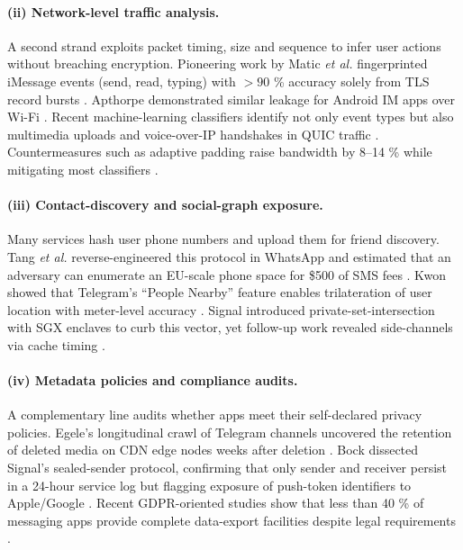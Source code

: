 \documentclass[a4paper,12pt]{report}
\begin{document}
\paragraph{(ii) Network-level traffic analysis.}
A second strand exploits packet timing, size and sequence to infer user
actions without breaching encryption.
Pioneering work by Matic \emph{et al.} fingerprinted iMessage events
(send, read, typing) with $>90$ \% accuracy solely from TLS record
bursts \cite{matic2015iMessage}.
Apthorpe demonstrated similar leakage for Android IM apps over Wi-Fi
\cite{apthorpe2018smart}.
Recent machine-learning classifiers identify not only event types but also
multimedia uploads and voice-over-IP handshakes in QUIC traffic
\cite{lee2023quic}.
Countermeasures such as adaptive padding raise bandwidth by 8–14 \%
while mitigating most classifiers \cite{poblete2021defence}.

\paragraph{(iii) Contact-discovery and social-graph exposure.}
Many services hash user phone numbers and upload them for friend
discovery.  Tang \emph{et al.} reverse-engineered this protocol in
WhatsApp and estimated that an adversary can enumerate an EU-scale phone
space for \$500 of SMS fees \cite{tang2020whatsappHash}.
Kwon showed that Telegram’s “People Nearby” feature enables trilateration
of user location with meter-level accuracy \cite{kwon2021telegram}.  Signal
introduced private-set‐intersection with SGX enclaves to curb this vector,
yet follow-up work revealed side-channels via cache timing
\cite{marforio2022psi}.

\paragraph{(iv) Metadata policies and compliance audits.}
A complementary line audits whether apps meet their self-declared privacy
policies.  Egele’s longitudinal crawl of Telegram channels uncovered the
retention of deleted media on CDN edge nodes weeks after deletion
\cite{egele2019cdn}.
Bock dissected Signal’s sealed-sender protocol, confirming that only
sender and receiver persist in a 24-hour service log but flagging
exposure of push-token identifiers to Apple/Google \cite{bock2020sealed}.
Recent GDPR-oriented studies show that less than 40 \% of messaging apps
provide complete data-export facilities despite legal requirements
\cite{frolov2022gdpr}.
\end{document}
